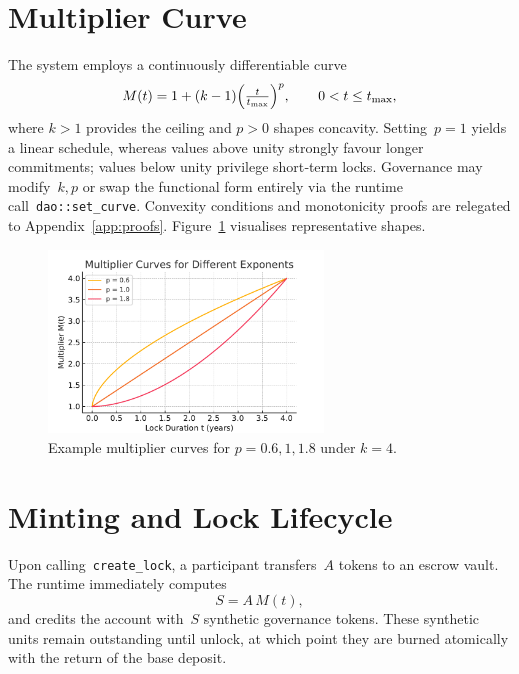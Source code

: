 \documentclass[11pt]{article}
\newcommand{\code}[1]{\texttt{#1}}
\begin{document}
\section{Multiplier Curve}
The system employs a continuously differentiable curve
\begin{equation}
M(t)=1+(k-1)\Bigl(\tfrac{t}{t_{\max}}\Bigr)^{p},\qquad 0<t\le t_{\max},
\label{eq:curve}
\end{equation}
where \(k>1\) provides the ceiling and \(p>0\) shapes concavity.  Setting~\(p=1\) yields a linear schedule, whereas values above unity strongly favour longer commitments; values below unity privilege short‑term locks. Governance may modify~\(k, p\) or swap the functional form entirely via the runtime call~\code{dao::set\_curve}. Convexity conditions and monotonicity proofs are relegated to Appendix~\ref{app:proofs}. Figure~\ref{fig:curve} visualises representative shapes.
\begin{figure}[h]
\centering
\includegraphics[width=0.65\textwidth]{curve_shapes.pdf}
\caption{Example multiplier curves for \(p=0.6,1,1.8\) under \(k=4\).}
\label{fig:curve}
\end{figure}

\section{Minting and Lock Lifecycle}
Upon calling~\code{create\_lock}, a participant transfers~\(A\) tokens to an escrow vault. The runtime immediately computes
\begin{equation}
S = A\,M(t),
\label{eq:mint}
\end{equation}
and credits the account with~\(S\) synthetic governance tokens. These synthetic units remain outstanding until unlock, at which point they are burned atomically with the return of the base deposit.

\end{document}
